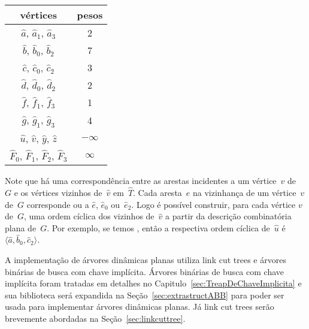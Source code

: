 \begin{minipage}[b]{0.4\textwidth}
\centering
\begin{tabular}{| c  c |} 
 \hline
 vértices & pesos\\
 \hline
 $\hat a$, $\hat a_1$, $\hat a_3$ & 2 \\ 
 \hline
 $\hat b$, $\hat b_0$, $\hat b_2$ & 7 \\
 \hline
 $\hat c$, $\hat c_0$, $\hat c_2$ & 3 \\
 \hline
 $\hat d$, $\hat d_0$, $\hat d_2$ & 2 \\
 \hline
 $\hat f$, $\hat f_1$, $\hat f_3$ & 1 \\
 \hline
 $\hat g$, $\hat g_1$, $\hat g_3$ & 4 \\
 \hline
 $\hat u$, $\hat v$, $\hat y$, $\hat z$ & $-\infty$ \\
 \hline
 $\hat F_0$, $\hat F_1$, $\hat F_2$, $\hat F_3$ & $\infty$ \\
 \hline
\end{tabular}
\end{minipage}
\hfill
\begin{minipage}[b]{0.5\textwidth}
    \centering

\label{fig:MSF-figura-3}
    \end{minipage}

Note que há uma correspondência entre as arestas incidentes a um vértice~$v$ de~$G$ e os vértices vizinhos de~$\hat v$ em~$\hat T$.
Cada aresta~$e$ na vizinhança de um vértice~$v$ de~$G$ corresponde ou a $\hat e$, $\hat e_0$ ou~$\hat e_2$. 
Logo é possível construir, para cada vértice $v$ de~$G$, uma ordem cíclica dos vizinhos de~$\hat v$ a partir da descrição combinatória plana de~$G$.
Por exemplo, se temos , então a respectiva ordem cíclica de~$\hat u$ é~$\langle \hat a, \hat b_0, \hat c_2 \rangle$.



A implementação de árvores dinâmicas planas utiliza link cut trees e árvores binárias de busca com chave implícita.
Árvores binárias de busca com chave implícita foram tratadas em detalhes no Capitulo~\ref{sec:TreapDeChaveImplicita} e sua biblioteca será expandida na Seção~\ref{sec:extrastructABB} para poder ser usada para implementar árvores dinâmicas planas.
Já link cut trees serão brevemente abordadas na Seção~\ref{sec:linkcuttree}.

